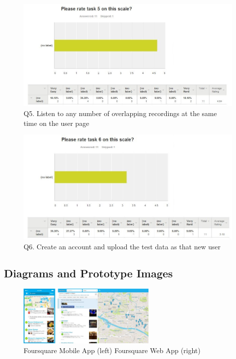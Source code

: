 \documentclass{l3proj}
\begin{document}
\newpage
\begin{figure}[ht!]
\centering
\includegraphics[width=\textwidth]{images/question-5-stats.jpg}
\caption{Q5. Listen to any number of overlapping recordings at the same time on the user page}
\end{figure}
\begin{figure}[ht!]
\centering
\includegraphics[width=\textwidth]{images/question-6-stats.jpg}
\caption{Q6. Create an account and upload the test data as that new user}
\end{figure}

\newpage
\subsection{Diagrams and Prototype Images}

\begin{figure}[ht!]
\centering
\includegraphics[angle=270, width=0.6\textwidth]{images/foursquare.jpg}
\caption{Foursquare Mobile App (left) Foursquare Web App (right)}
\end{figure}
\end{document}
